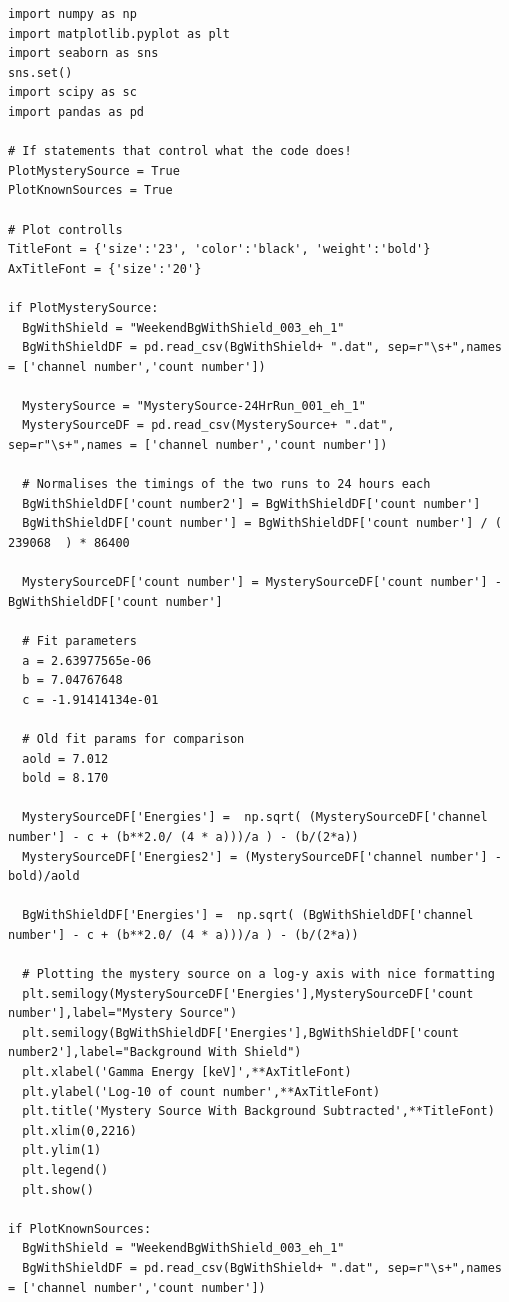 \documentclass[11pt,a4paper]{article}
\begin{document}
\begin{verbatim}
import numpy as np
import matplotlib.pyplot as plt
import seaborn as sns
sns.set()
import scipy as sc
import pandas as pd

# If statements that control what the code does! 
PlotMysterySource = True
PlotKnownSources = True

# Plot controlls
TitleFont = {'size':'23', 'color':'black', 'weight':'bold'} 
AxTitleFont = {'size':'20'}

if PlotMysterySource:
  BgWithShield = "WeekendBgWithShield_003_eh_1"
  BgWithShieldDF = pd.read_csv(BgWithShield+ ".dat", sep=r"\s+",names = ['channel number','count number'])
  
  MysterySource = "MysterySource-24HrRun_001_eh_1"
  MysterySourceDF = pd.read_csv(MysterySource+ ".dat", sep=r"\s+",names = ['channel number','count number'])
  
  # Normalises the timings of the two runs to 24 hours each
  BgWithShieldDF['count number2'] = BgWithShieldDF['count number'] 
  BgWithShieldDF['count number'] = BgWithShieldDF['count number'] / ( 239068  ) * 86400
  
  MysterySourceDF['count number'] = MysterySourceDF['count number'] - BgWithShieldDF['count number']
  
  # Fit parameters
  a = 2.63977565e-06
  b = 7.04767648
  c = -1.91414134e-01

  # Old fit params for comparison
  aold = 7.012
  bold = 8.170

  MysterySourceDF['Energies'] =  np.sqrt( (MysterySourceDF['channel number'] - c + (b**2.0/ (4 * a)))/a ) - (b/(2*a))
  MysterySourceDF['Energies2'] = (MysterySourceDF['channel number'] -bold)/aold

  BgWithShieldDF['Energies'] =  np.sqrt( (BgWithShieldDF['channel number'] - c + (b**2.0/ (4 * a)))/a ) - (b/(2*a))

  # Plotting the mystery source on a log-y axis with nice formatting
  plt.semilogy(MysterySourceDF['Energies'],MysterySourceDF['count number'],label="Mystery Source")
  plt.semilogy(BgWithShieldDF['Energies'],BgWithShieldDF['count number2'],label="Background With Shield")
  plt.xlabel('Gamma Energy [keV]',**AxTitleFont)
  plt.ylabel('Log-10 of count number',**AxTitleFont)
  plt.title('Mystery Source With Background Subtracted',**TitleFont)
  plt.xlim(0,2216)
  plt.ylim(1)
  plt.legend()
  plt.show()

if PlotKnownSources:
  BgWithShield = "WeekendBgWithShield_003_eh_1"
  BgWithShieldDF = pd.read_csv(BgWithShield+ ".dat", sep=r"\s+",names = ['channel number','count number'])
  

\end{verbatim}
\end{document}

